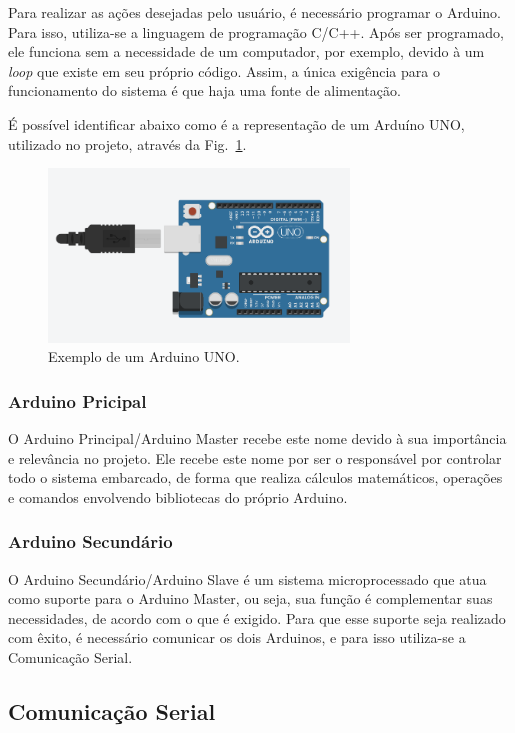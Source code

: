 \documentclass[conference]{IEEEtran}
\begin{document}
    Para realizar as ações desejadas pelo usuário, é necessário programar o Arduino. Para isso, utiliza-se 
a linguagem de programação C/C++. Após ser programado, ele funciona sem a necessidade de um computador, por
exemplo, devido à um \emph{loop} que existe em seu próprio código. Assim, a única exigência para o
funcionamento do sistema é que haja uma fonte de alimentação.

    É possível identificar abaixo como é a representação de um Arduíno UNO, utilizado no projeto, através
da Fig.~\ref{fig1}.

\begin{figure}[htbp]
    \centerline{
        \includegraphics[width=8cm]{imagens/Arduino_UNO.png}
        }
    \caption{Exemplo de um Arduino UNO.}
    \label{fig1}
    \end{figure}

\subsubsection{Arduino Pricipal}

    O Arduino Principal/Arduino Master recebe este nome devido à sua importância e relevância no projeto.
Ele recebe este nome por ser o responsável por controlar todo o sistema embarcado, de forma que realiza
cálculos matemáticos, operações e comandos envolvendo bibliotecas do próprio Arduino.

\subsubsection{Arduino Secundário}

    O Arduino Secundário/Arduino Slave é um sistema microprocessado que atua como suporte para o 
Arduino Master, ou seja, sua função é complementar suas necessidades, de acordo com o que é exigido.
Para que esse suporte seja realizado com êxito, é necessário comunicar os dois Arduinos, e para isso
utiliza-se a Comunicação Serial.

\subsection{Comunicação Serial}
\end{document}
